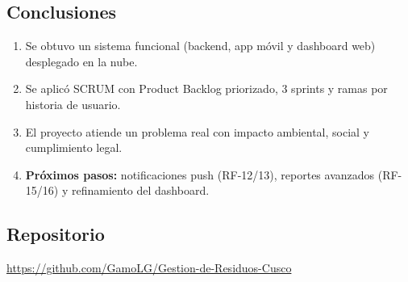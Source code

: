 \documentclass[11pt,a4paper]{article}
\begin{document}
\subsection{Conclusiones}
\begin{enumerate}[leftmargin=*]
    \item Se obtuvo un sistema funcional (backend, app móvil y dashboard web) desplegado en la nube.
    \item Se aplicó SCRUM con Product Backlog priorizado, 3 sprints y ramas por historia de usuario.
    \item El proyecto atiende un problema real con impacto ambiental, social y cumplimiento legal.
    \item \textbf{Próximos pasos:} notificaciones push (RF-12/13), reportes avanzados (RF-15/16) y refinamiento del dashboard.
\end{enumerate}

\subsection*{Repositorio}
\url{https://github.com/GamoLG/Gestion-de-Residuos-Cusco}
\end{document}
